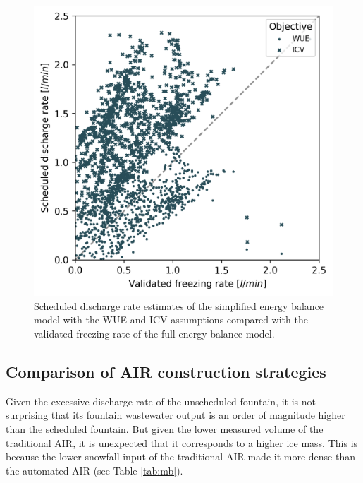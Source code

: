 \documentclass[tc, manuscript]{copernicus}
\begin{document}
\begin{figure}[t]
\includegraphics[width=12cm]{Figures/freezing_rate_corr.png}
\caption{Scheduled discharge rate estimates of the simplified energy balance model with the WUE and ICV
assumptions compared with the validated freezing rate of the full energy balance model.}
\label{fig:freezing_rate}
\end{figure}

\subsection{Comparison of AIR construction strategies}

Given the excessive discharge rate of the unscheduled fountain, it is not surprising that its fountain
wastewater output is an order of magnitude higher than the scheduled fountain. But given the lower measured
volume of the traditional AIR, it is unexpected that it corresponds to a higher ice mass. This is because the
lower snowfall input of the traditional AIR made it more dense than the automated AIR (see Table \ref{tab:mb}). 
\end{document}
